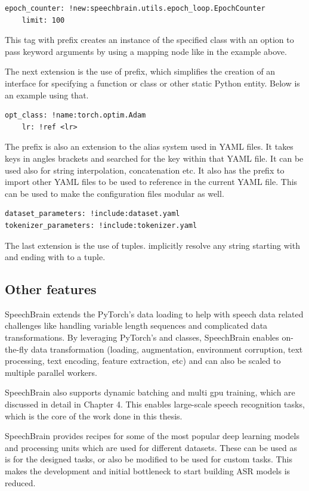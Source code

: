 \begin{verbatim}
epoch_counter: !new:speechbrain.utils.epoch_loop.EpochCounter
    limit: 100
\end{verbatim}

This tag with prefix  creates an instance of the specified class with an option to pass keyword arguments by using a mapping node like in the example above.

The next extension is the use of prefix,  which simplifies the creation of an interface for specifying a function or class or other static Python entity. Below is an example using that.
\begin{verbatim}
opt_class: !name:torch.optim.Adam
    lr: !ref <lr>
\end{verbatim}
The prefix  is also an extension to the alias system used in YAML files. It takes keys in angles brackets and searched for the key within that YAML file. It can be used also for string interpolation, concatenation etc. It also has the  prefix to import other YAML files to be used to reference in the current YAML file. This can be used to make the configuration files modular as well. 

\begin{verbatim}
dataset_parameters: !include:dataset.yaml
tokenizer_parameters: !include:tokenizer.yaml
\end{verbatim}

The last extension is the use of tuples. implicitly resolve any string starting with \inlinecode{(} and ending with \inlinecode{)} to a tuple.

\subsection{Other features}
SpeechBrain extends the PyTorch's data loading to help with speech data related challenges like handling variable length sequences and complicated data transformations. By leveraging PyTorch's  and  classes, SpeechBrain enables on-the-fly data transformation (loading, augmentation, environment corruption, text processing, text encoding, feature extraction, etc) and can also be scaled to multiple parallel workers.

SpeechBrain also supports dynamic batching and multi \acrshort{gpu} training, which are discussed in detail in Chapter 4. This enables large-scale speech recognition tasks, which is the core of the work done in this thesis.  

SpeechBrain provides recipes for some of the most popular deep learning models and processing units which are used for different datasets. These can be used as is for the designed tasks, or also be modified to be used for custom tasks. This makes the development and initial bottleneck to start building ASR models is reduced.